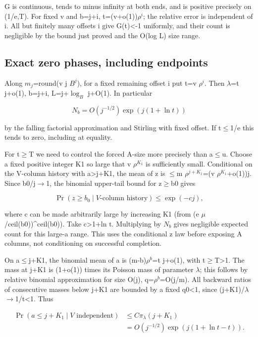 \documentclass[11pt]{article}
\begin{document}
G is continuous, tends to minus infinity at both ends, and is positive precisely on (1/e,T). For fixed v and b=j+i, t=(v+o(1))$\rho^{i}$; the relative error is independent of i. All but finitely many offsets i give G(t)<-1 uniformly, and their count is negligible by the bound just proved and the O(log L) size range.

\subsection{Exact zero phases, including endpoints}

Along $m_{j}$=round(v j $B^{j}$), for a fixed remaining offset i put t=v $\rho^{i}$. Then $\lambda$=t j+o(1), b=j+i, L=j+$\log_B$ j+O(1). In particular

\[
N_b=O(j^{-1/2})\exp(j(1+\ln t))
\]

by the falling factorial approximation and Stirling with fixed offset. If t\ensuremath{\leq}1/e this tends to zero, including at equality.

For t\ensuremath{\geq}T we need to control the forced A-size more precisely than a\ensuremath{\leq}u. Choose a fixed positive integer K1 so large that v $\rho^{K_1}$ is sufficiently small. Conditional on the V-column history with a>j+K1, the mean of z is \ensuremath{\leq}m $\rho^{j+K_1}$=(v $\rho^{K_1}$+o(1))j. Since b0/j\ensuremath{\to}1, the binomial upper-tail bound for z\ensuremath{\geq}b0 gives

\[
\Pr(z\geq b_0\mid V\text{-column history})\leq\exp(-cj),
\]

where c can be made arbitrarily large by increasing K1 (from (e $\mu$/ceil(b0))\textasciicircum{}ceil(b0)). Take c>1+ln t. Multiplying by $N_{b}$ gives negligible expected count for this large-a range. This uses the conditional z law before exposing A columns, not conditioning on successful completion.

On a\ensuremath{\leq}j+K1, the binomial mean of a is (m-b)$\rho^{b}$=t j+o(1), with t\ensuremath{\geq}T>1. The mass at j+K1 is (1+o(1)) times its Poisson mass of parameter $\lambda$; this follows by relative binomial approximation for size O(j), q=$\rho^{b}$=O(j/m). All backward ratios of consecutive masses below j+K1 are bounded by a fixed q0<1, since (j+K1)/$\lambda$\ensuremath{\to}1/t<1. Thus

\[
\begin{aligned}\Pr(a\leq j+K_1\mid V\text{ independent})&\leq C\pi_\lambda(j+K_1)\\&=O(j^{-1/2})\exp(j(1+\ln t-t)).\end{aligned}
\]
\end{document}
